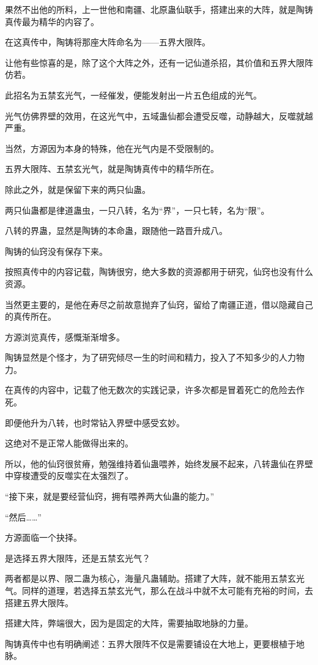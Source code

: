 \begin{this_body}
果然不出他的所料，上一世他和南疆、北原蛊仙联手，搭建出来的大阵，就是陶铸真传最为精华的内容了。

在这真传中，陶铸将那座大阵命名为——五界大限阵。

让他有些惊喜的是，除了这个大阵之外，还有一记仙道杀招，其价值和五界大限阵仿若。

此招名为五禁玄光气，一经催发，便能发射出一片五色组成的光气。

光气仿佛界壁的效用，在这光气中，五域蛊仙都会遭受反噬，动静越大，反噬就越严重。

当然，方源因为本身的特殊，他在光气内是不受限制的。

五界大限阵、五禁玄光气，就是陶铸真传中的精华所在。

除此之外，就是保留下来的两只仙蛊。

两只仙蛊都是律道蛊虫，一只八转，名为“界”，一只七转，名为“限”。

八转的界蛊，显然是陶铸的本命蛊，跟随他一路晋升成八。

陶铸的仙窍没有保存下来。

按照真传中的内容记载，陶铸很穷，绝大多数的资源都用于研究，仙窍也没有什么资源。

当然更主要的，是他在寿尽之前故意抛弃了仙窍，留给了南疆正道，借以隐藏自己的真传所在。

方源浏览真传，感慨渐渐增多。

陶铸显然是个怪才，为了研究倾尽一生的时间和精力，投入了不知多少的人力物力。

在真传的内容中，记载了他无数次的实践记录，许多次都是冒着死亡的危险去作死。

即便他升为八转，也时常钻入界壁中感受玄妙。

这绝对不是正常人能做得出来的。

所以，他的仙窍很贫瘠，勉强维持着仙蛊喂养，始终发展不起来，八转蛊仙在界壁中穿梭遭受的反噬实在太强烈了。

“接下来，就是要经营仙窍，拥有喂养两大仙蛊的能力。”

“然后……”

方源面临一个抉择。

是选择五界大限阵，还是五禁玄光气？

两者都是以界、限二蛊为核心，海量凡蛊辅助。搭建了大阵，就不能用五禁玄光气。同样的道理，若选择五禁玄光气，那么在战斗中就不太可能有充裕的时间，去搭建五界大限阵。

搭建大阵，弊端很大，因为是固定的大阵，需要抽取地脉的力量。

陶铸真传中也有明确阐述：五界大限阵不仅是需要铺设在大地上，更要根植于地脉。


\end{this_body}

